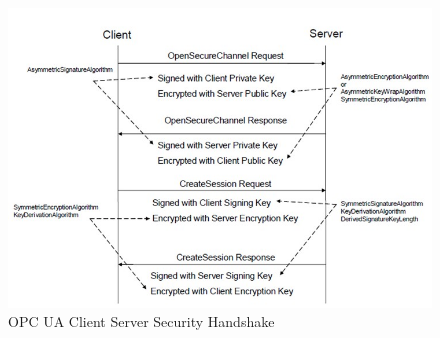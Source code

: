 \documentclass[]{llncs}
\begin{document}
\begin{figure}[!htb]
	\centering
	\includegraphics[width=1\textwidth]{opc_ua_shs.jpg}
		\caption[ ]{OPC UA Client Server Security Handshake\cite{O2}}
	\label{fig:opc_ua_cs_shs}
\end{figure}
\end{document}

